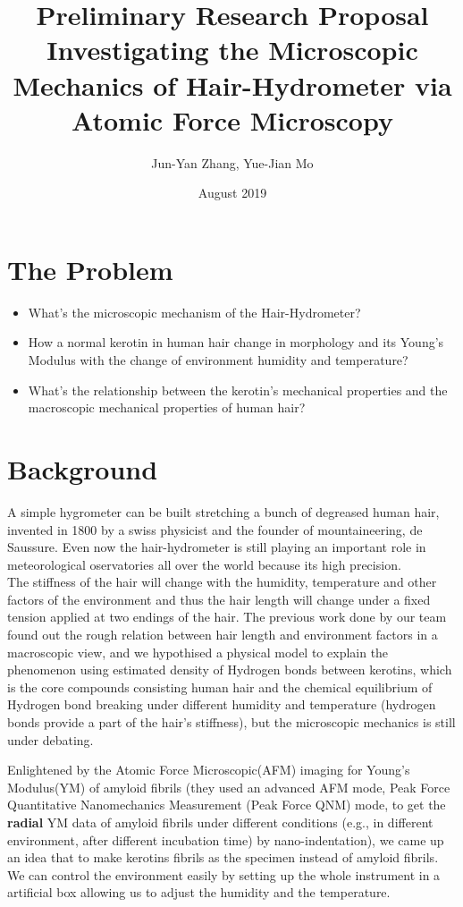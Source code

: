 \documentclass{article}
\title{\textbf{Preliminary Research Proposal}\\Investigating the Microscopic Mechanics of Hair-Hydrometer via Atomic Force Microscopy }
\author{Jun-Yan Zhang, Yue-Jian Mo}
\date{August 2019}
\begin{document}
\maketitle

\begin{abstract}
    
\end{abstract}

\section{The Problem}
\begin{itemize}
\item What's the microscopic mechanism of the Hair-Hydrometer?
\item How a normal kerotin in human hair change in morphology and its Young's Modulus with the change of environment humidity and temperature? 
\item What's the relationship between the kerotin's mechanical properties and the macroscopic mechanical properties of human hair?
\end{itemize}

\section{Background}
A simple hygrometer can be built stretching a bunch of degreased human hair, invented in 1800 by a swiss physicist and the founder of mountaineering, de Saussure. Even now the hair-hydrometer is still playing an important role in meteorological oservatories all over the world because its high precision. \\
The stiffness of the hair will change with the humidity, temperature and other factors of the environment and thus the hair length will change under a fixed tension applied at two endings of the hair. The previous work done by our team found out the rough relation between hair length and environment factors in a macroscopic view, and we hypothised a physical model to explain the phenomenon using estimated density of Hydrogen bonds between kerotins, which is the core compounds consisting human hair and the chemical equilibrium of Hydrogen bond breaking under different humidity and temperature (hydrogen bonds provide a part of the hair's stiffness), but the microscopic mechanics is still under debating.

Enlightened by the Atomic Force Microscopic(AFM) imaging for Young's Modulus(YM) of amyloid fibrils \citep{lee2016advances}(they used an advanced AFM mode, Peak Force Quantitative Nanomechanics Measurement (Peak Force QNM) mode, to get the \textbf{radial} YM data of amyloid fibrils under different conditions (e.g., in different environment, after different incubation time) by nano-indentation), we came up an idea that to make kerotins fibrils as the specimen instead of amyloid fibrils.  \\
We can control the environment easily by setting up the whole instrument in a artificial box allowing us to adjust the humidity and the temperature.
\end{document}
